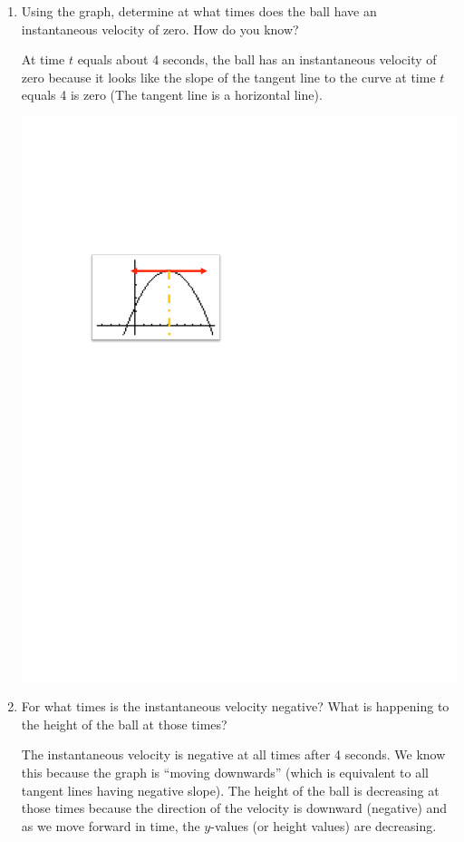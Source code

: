 \documentclass[nooutcomes]{ximera}
\begin{document}
\begin{problem}
\begin{enumerate}
		\item  Using the graph, determine at what times does the ball have an instantaneous velocity of zero.  How do you know?
		\begin{freeResponse}		 
		At time $t$ equals about 4 seconds, the ball has an instantaneous velocity of zero because it looks like the slope of the tangent line to the curve at time $t$ equals 4 is zero (The tangent line is a horizontal line).
			\begin{image}
			\includegraphics[trim= 80 470 300 180]{Figure7.pdf}
			\end{image}
		\end{freeResponse}
		
		
		
		\item  For what times is the instantaneous velocity negative?  What is happening to the height of the ball at those times?
			
		\begin{freeResponse}		 
		The instantaneous velocity is negative at all times after 4 seconds.  We know this because the graph is ``moving downwards'' (which is equivalent to all tangent lines having negative slope).  The height of the ball is decreasing at those times because the direction of the velocity is downward (negative) and as we move forward in time, the $y$-values (or height values) are decreasing. 
		\end{freeResponse}
			
		\end{enumerate}
			
\end{problem}
			
\end{document}
